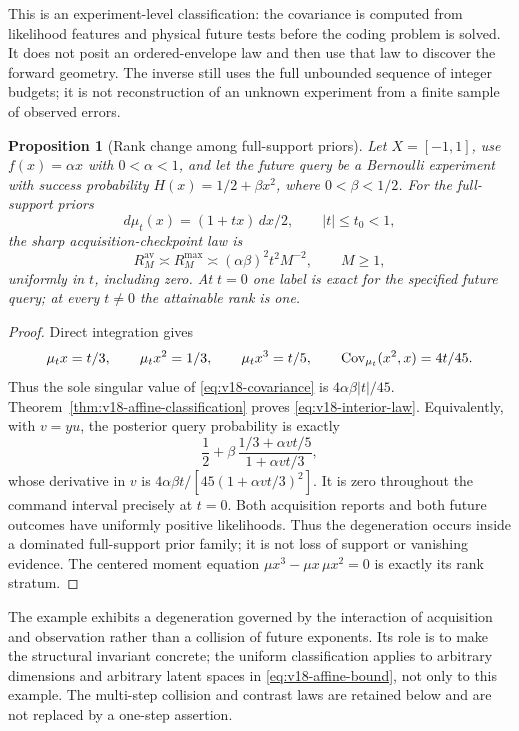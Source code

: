 \documentclass[11pt]{amsart}
\newtheorem{proposition}[theorem]{Proposition}
\theoremstyle{definition}\newtheorem{definition}[theorem]{Definition}
\theoremstyle{remark}\newtheorem{remark}[theorem]{Remark}
\begin{document}
This is an experiment-level classification: the covariance is computed
from likelihood features and physical future tests before the coding
problem is solved. It does not posit an ordered-envelope law and then
use that law to discover the forward geometry. The inverse still uses
the full unbounded sequence of integer budgets; it is not reconstruction
of an unknown experiment from a finite sample of observed errors.

\begin{proposition}[Rank change among full-support priors]
\label{prop:v18-interior-example}
Let $X=[-1,1]$, use $f(x)=\alpha x$ with $0<\alpha<1$, and let the
future query be a Bernoulli experiment with success probability
$H(x)=1/2+\beta x^2$, where $0<\beta<1/2$. For the full-support priors
\[
 d\mu_t(x)=(1+tx)\,dx/2,\qquad |t|\le t_0<1,
\]
the sharp acquisition-checkpoint law is
\begin{equation}\label{eq:v18-interior-law}
 R^{\mathrm{av}}_M\asymp R^{\mathrm{max}}_M
 \asymp (\alpha\beta)^2t^2M^{-2},\qquad M\ge1,
\end{equation}
uniformly in $t$, including zero. At $t=0$ one label is exact for the
specified future query; at every $t\ne0$ the attainable rank is one.
\end{proposition}
\begin{proof}
Direct integration gives
\[
 \mu_tx=t/3,\qquad \mu_tx^2=1/3,\qquad \mu_tx^3=t/5,
 \qquad \operatorname{Cov}_{\mu_t}(x^2,x)=4t/45.
\]
Thus the sole singular value of \eqref{eq:v18-covariance} is
$4\alpha\beta|t|/45$. Theorem~\ref{thm:v18-affine-classification}
proves \eqref{eq:v18-interior-law}. Equivalently, with $v=yu$, the
posterior query probability is exactly
\[
 \frac12+\beta\,
 \frac{1/3+\alpha vt/5}{1+\alpha vt/3},
\]
whose derivative in $v$ is
$4\alpha\beta t/[45(1+\alpha vt/3)^2]$.
It is zero throughout the command interval precisely at $t=0$.
Both acquisition reports and both future outcomes have uniformly
positive likelihoods. Thus the degeneration occurs inside a dominated
full-support prior family; it is not loss of support or vanishing
evidence. The centered moment equation $\mu x^3-\mu x\,\mu x^2=0$
is exactly its rank stratum.
\end{proof}

The example exhibits a degeneration governed by the interaction of
acquisition and observation rather than a collision of future exponents.
Its role is to make the structural invariant concrete; the uniform
classification applies to arbitrary dimensions and arbitrary latent
spaces in \eqref{eq:v18-affine-bound}, not only to this example. The
multi-step collision and contrast laws are retained below and are not
replaced by a one-step assertion.
\end{document}
